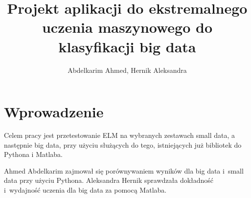 \documentclass{article}
\title{Projekt aplikacji do ekstremalnego uczenia maszynowego do klasyfikacji big data}
\author{Abdelkarim Ahmed, Hernik Aleksandra}
\date{}
\begin{document}
\renewcommand*\listfigurename{Wykaz rysunków}
\renewcommand*\listtablename{Wykaz tabel}
\clearpage
\vspace*{\fill}
\begin{center}
\begin{minipage}{.9\textwidth}
\maketitle
\end{minipage}
\end{center}
\vfill %
\clearpage

\tableofcontents
\clearpage

\section*{Wprowadzenie}
Celem pracy jest przetestowanie ELM na wybranych zestawach small data, a następnie big data, przy użyciu służących do tego, istniejących już bibliotek do Pythona i Matlaba.

Ahmed Abdelkarim zajmował się porównywaniem wyników dla big data i~small data przy użyciu Pythona.
Aleksandra Hernik sprawdzała dokładność i~wydajność uczenia dla big data za pomocą Matlaba.

\clearpage
\end{document}
